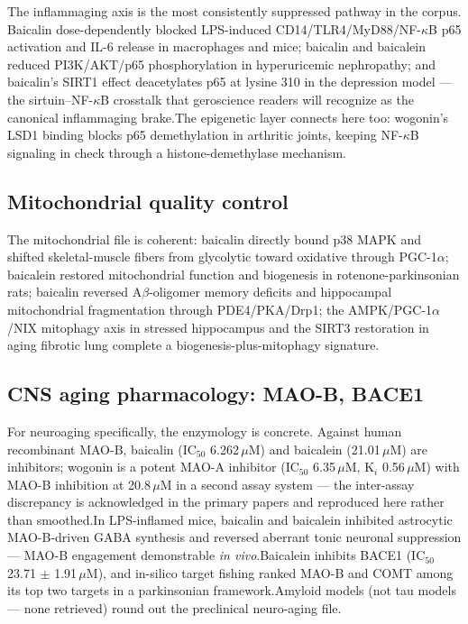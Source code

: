 \documentclass[11pt]{article}
\newcommand{\src}[1]{\allowbreak[#1]}
\begin{document}
The inflammaging axis is the most consistently suppressed pathway in the corpus. Baicalin dose-dependently blocked LPS-induced CD14/TLR4/MyD88/NF-$\kappa$B p65 activation and IL-6 release in macrophages and mice; baicalin and baicalein reduced PI3K/AKT/p65 phosphorylation in hyperuricemic nephropathy; and baicalin's SIRT1 effect deacetylates p65 at lysine 310 in the depression model --- the sirtuin--NF-$\kappa$B crosstalk that geroscience readers will recognize as the canonical inflammaging brake.\src{189}\src{186}\src{122} The epigenetic layer connects here too: wogonin's LSD1 binding blocks p65 demethylation in arthritic joints, keeping NF-$\kappa$B signaling in check through a histone-demethylase mechanism.\src{155}

\subsection{Mitochondrial quality control}

The mitochondrial file is coherent: baicalin directly bound p38 MAPK and shifted skeletal-muscle fibers from glycolytic toward oxidative through PGC-1$\alpha$; baicalein restored mitochondrial function and biogenesis in rotenone-parkinsonian rats; baicalin reversed A$\beta$-oligomer memory deficits and hippocampal mitochondrial fragmentation through PDE4/PKA/Drp1; the AMPK/PGC-1$\alpha$/NIX mitophagy axis in stressed hippocampus and the SIRT3 restoration in aging fibrotic lung complete a biogenesis-plus-mitophagy signature.\src{191}\src{176}\src{179}\src{182}\src{177}

\subsection{CNS aging pharmacology: MAO-B, BACE1}

For neuroaging specifically, the enzymology is concrete. Against human recombinant MAO-B, baicalin (IC$_{50}$ 6.262\,$\mu$M) and baicalein (21.01\,$\mu$M) are inhibitors; wogonin is a potent MAO-A inhibitor (IC$_{50}$ 6.35\,$\mu$M, K$_i$ 0.56\,$\mu$M) with MAO-B inhibition at 20.8\,$\mu$M in a second assay system --- the inter-assay discrepancy is acknowledged in the primary papers and reproduced here rather than smoothed.\src{185}\src{196} In LPS-inflamed mice, baicalin and baicalein inhibited astrocytic MAO-B-driven GABA synthesis and reversed aberrant tonic neuronal suppression --- MAO-B engagement demonstrable \emph{in vivo}.\src{184} Baicalein inhibits BACE1 (IC$_{50}$ 23.71 $\pm$ 1.91\,$\mu$M), and in-silico target fishing ranked MAO-B and COMT among its top two targets in a parkinsonian framework.\src{166}\src{171} Amyloid models (not tau models --- none retrieved) round out the preclinical neuro-aging file.\src{179}
\end{document}
